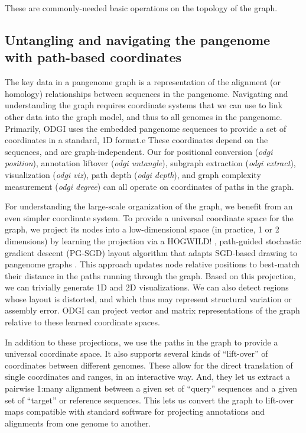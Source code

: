 \documentclass{bioinfo}
\begin{document}
These are commonly-needed basic operations on the topology of the graph.



\subsection{Untangling and navigating the pangenome with path-based coordinates}
\label{sec:untangle}


The key data in a pangenome graph is a representation of the alignment (or homology) relationships between sequences in the pangenome.
Navigating and understanding the graph requires coordinate systems that we can use to link other data into the graph model, and thus to all genomes in the pangenome.
Primarily, ODGI uses the embedded pangenome sequences to provide a set of coordinates in a standard, 1D format.e
These coordinates depend on the sequences, and are graph-independent.
Our for positional conversion (\textit{odgi position}), annotation liftover (\textit{odgi untangle}), subgraph extraction (\textit{odgi extract}), visualization (\textit{odgi viz}), path depth (\textit{odgi depth}), and graph complexity measurement (\textit{odgi degree}) can all operate on coordinates of paths in the graph.

For understanding the large-scale organization of the graph, we benefit from an even simpler coordinate system.
To provide a universal coordinate space for the graph, we project its nodes into a low-dimensional space (in practice, 1 or 2 dimensions) by learning the projection via a HOGWILD! \citep{niu2011hogwild}, path-guided stochastic gradient descent (PG-SGD) layout algorithm that adapts SGD-based drawing to pangenome graphs \citep{zheng2018graph}.
This approach updates node relative positions to best-match their distance in the paths running through the graph.
Based on this projection, we can trivially generate 1D and 2D visualizations.
We can also detect regions whose layout is distorted, and which thus may represent structural variation or assembly error.
ODGI can project vector and matrix representations of the graph relative to these learned coordinate spaces.

In addition to these projections, we use the paths in the graph to provide a universal coordinate space.
It also supports several kinds of ``lift-over'' of coordinates between different genomes.
These allow for the direct translation of single coordinates and ranges, in an interactive way.
And, they let us extract a pairwise 1:many alignment between a given set of ``query'' sequences and a given set of ``target'' or reference sequences.
This lets us convert the graph to lift-over maps compatible with standard software for projecting annotations and alignments from one genome to another.
\end{document}
